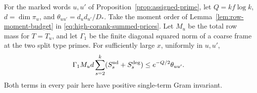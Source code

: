 \begin{auxlemma}\label{lem:higher-corank-total-error}
For the marked words \(u,u'\) of Proposition~\ref{prop:assigned-prime},
let \(Q=kf\log k\), \(d=\dim\pi_u\), and
\(\theta_{uu'}=d_ud_{u'}/D_*\). Take the moment order of
Lemma~\ref{lem:row-moment-budget} in \eqref{eq:high-corank-summed-prices}.
Let \(M_u\) be the total row mass for \(T=T_u\), and let
\(\Gamma_1\) be the finite diagonal squared norm of a coarse frame at the
two split type primes. For sufficiently large \(x\), uniformly in
\(u,u'\),
\begin{equation}\label{eq:high-corank-in-gram-units}
 \Gamma_1 M_u d\sum_{s=2}^k(S_s^{\rm nd}+S_s^{\rm deg})
       \le e^{-Q/2}\theta_{uu'} .
\end{equation}
Both terms in every pair here have positive single-term Gram invariant.
\end{auxlemma}
